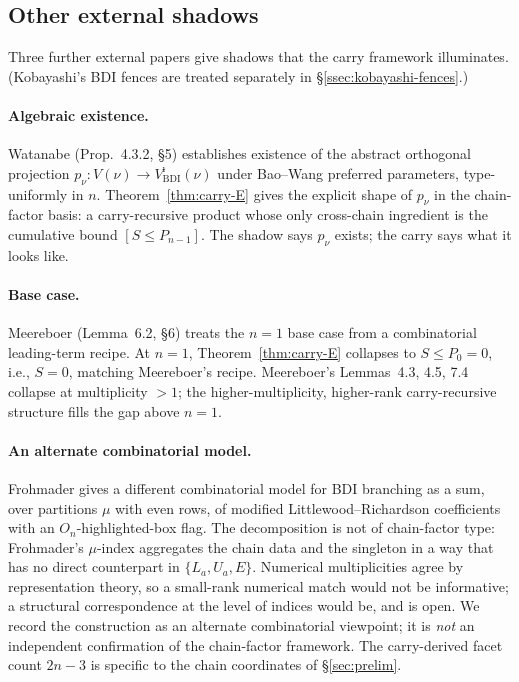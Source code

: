 \subsection{Other external shadows}\label{ssec:carry-shadows}

Three further external papers give shadows that the carry framework illuminates.
(Kobayashi's BDI fences are treated separately in \S\ref{ssec:kobayashi-fences}.)

\paragraph{Algebraic existence.} Watanabe \cite{Watanabe2407} (Prop.~4.3.2, \S5)
establishes existence of the abstract orthogonal projection
$p_\nu : V(\nu) \to V^\imath_{\mathrm{BDI}}(\nu)$ under Bao--Wang preferred
parameters, type-uniformly in $n$. Theorem~\ref{thm:carry-E} gives the explicit
shape of $p_\nu$ in the chain-factor basis: a carry-recursive product whose only
cross-chain ingredient is the cumulative bound $[S \le P_{n-1}]$. The shadow
says $p_\nu$ exists; the carry says what it looks like.

\paragraph{Base case.} Meereboer \cite{Meereboer2510} (Lemma~6.2, \S6) treats the
$n = 1$ base case from a combinatorial leading-term recipe. At $n = 1$,
Theorem~\ref{thm:carry-E} collapses to $S \le P_0 = 0$, i.e., $S = 0$, matching
Meereboer's recipe. Meereboer's Lemmas~4.3, 4.5, 7.4 collapse at multiplicity
$> 1$; the higher-multiplicity, higher-rank carry-recursive structure fills the
gap above $n = 1$.

\paragraph{An alternate combinatorial model.} Frohmader \cite{Frohmader2312v2}
gives a different combinatorial model for BDI branching as a sum, over partitions
$\mu$ with even rows, of modified Littlewood--Richardson coefficients with an
$O_n$-highlighted-box flag. The decomposition is not of chain-factor type:
Frohmader's $\mu$-index aggregates the chain data and the singleton in a way
that has no direct counterpart in $\{L_a, U_a, E\}$. Numerical multiplicities
agree by representation theory, so a small-rank numerical match would not
be informative; a structural correspondence at the level of indices would be,
and is open. We record the construction as an alternate combinatorial viewpoint;
it is \emph{not} an independent confirmation of the chain-factor framework. The
carry-derived facet count $2n - 3$ is specific to the chain coordinates of
\S\ref{sec:prelim}.

